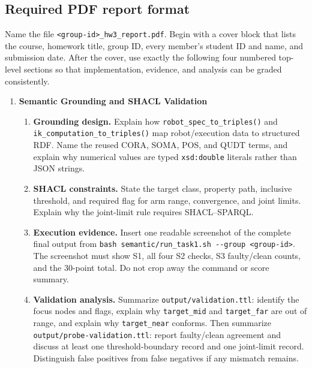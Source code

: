 \documentclass[11pt]{article}
\newcommand{\code}[1]{\nolinkurl{#1}}
\begin{document}
\subsection*{Required PDF report format}

Name the file \code{<group-id>_hw3_report.pdf}. Begin with a cover block that
lists the course, homework title, group ID, every member's student ID and name,
and submission date. After the cover, use exactly the following four numbered
top-level sections so that implementation, evidence, and analysis can be graded
consistently.

\begin{enumerate}[label=\textbf{\arabic*.},leftmargin=2em]
  \item \textbf{Semantic Grounding and SHACL Validation}
  \begin{enumerate}[label*=\arabic*.,leftmargin=2.4em]
    \item \textbf{Grounding design.} Explain how
      \code{robot_spec_to_triples()} and \code{ik_computation_to_triples()}
      map robot/execution data to structured RDF. Name the reused CORA, SOMA,
      POS, and QUDT terms, and explain why numerical values are typed
      \code{xsd:double} literals rather than JSON strings.
    \item \textbf{SHACL constraints.} State the target class, property path,
      inclusive threshold, and required flag for arm range, convergence, and
      joint limits. Explain why the joint-limit rule requires SHACL--SPARQL.
    \item \textbf{Execution evidence.} Insert one readable screenshot of the
      complete final output from
      \code{bash semantic/run_task1.sh --group <group-id>}. The screenshot must
      show S1, all four S2 checks, S3 faulty/clean counts, and the 30-point
      total. Do not crop away the command or score summary.
    \item \textbf{Validation analysis.} Summarize
      \code{output/validation.ttl}: identify the focus nodes and flags, explain
      why \code{target_mid} and \code{target_far} are out of range, and explain
      why \code{target_near} conforms. Then summarize
      \code{output/probe-validation.ttl}: report faulty/clean agreement and
      discuss at least one threshold-boundary record and one joint-limit record.
      Distinguish false positives from false negatives if any mismatch remains.
  \end{enumerate}


\end{enumerate}
\end{document}
